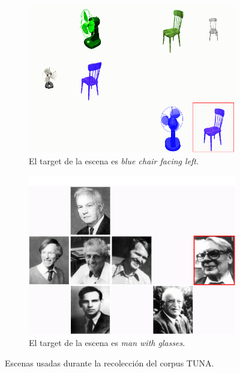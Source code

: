 \begin{figure}[h]
\begin{subfigure}{.49\textwidth}
  \centering
\includegraphics[width=\textwidth]{images/tuna.jpg}
\caption{El target de la escena es \emph{blue chair facing left}.}
\label{Tuna-scene}
\end{subfigure}
\begin{subfigure}{.49\textwidth}
 \centering
\vspace*{-.4cm}
\includegraphics[width=\textwidth]{images/tuna-people.jpg}
\caption{El target de la escena es \emph{man with glasses}.} 
\label{Tuna-people-scene}
\end{subfigure}
\caption{Escenas usadas durante la recolecci\'on del corpus TUNA.} 
\end{figure}


